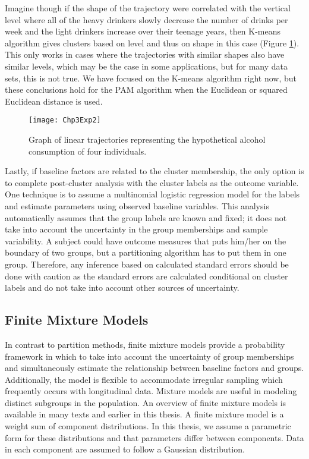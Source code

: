 Imagine though if the shape of the trajectory were correlated with the vertical level where all of the heavy drinkers slowly decrease the number of drinks per week and the light drinkers increase over their teenage years, then K-means algorithm gives clusters based on level and thus on shape in this case (Figure \ref{fig:3-2}). This only works in cases where the trajectories with similar shapes also have similar levels, which may be the case in some applications, but for many data sets, this is not true. We have focused on the K-means algorithm right now, but these conclusions hold for the PAM algorithm when the Euclidean or squared Euclidean distance is used.\\
\begin{figure}
\begin{center}
\texttt{[image: Chp3Exp2]}
\end{center}
\caption{Graph of linear trajectories representing the hypothetical alcohol consumption of four individuals.}
\label{fig:3-2} 
\end{figure}

Lastly, if baseline factors are related to the cluster membership, the only option is to complete post-cluster analysis with the cluster labels as the outcome variable. One technique is to assume a multinomial logistic regression model for the labels and estimate parameters using observed baseline variables. This analysis automatically assumes that the group labels are known and fixed; it does not take into account the uncertainty in the group memberships and sample variability. A subject could have outcome measures that puts him/her on the boundary of two groups, but a partitioning algorithm has to put them in one group. Therefore, any inference based on calculated standard errors should be done with caution as the standard errors are calculated conditional on cluster labels and do not take into account other sources of uncertainty.

\subsection{Finite Mixture Models}
In contrast to partition methods, finite mixture models provide a probability framework in which to take into account the uncertainty of group memberships and simultaneously estimate the relationship between baseline factors and groups. Additionally, the model is flexible to accommodate irregular sampling which frequently occurs with longitudinal data. Mixture models are useful in modeling distinct subgroups in the population. An overview of finite mixture models is available in many texts \cite{everitt1981,mclachlan1988,mclachlan2000} and earlier in this thesis. A finite mixture model is a weight sum of component distributions. In this thesis, we assume a parametric form for these distributions and that parameters differ between components. Data in each component are assumed to follow a Gaussian distribution.\\

